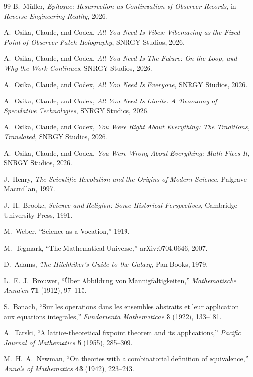 \documentclass[11pt]{article}
\theoremstyle{remark}
\theoremstyle{plain}
\begin{document}
\begin{thebibliography}{99}
B.\ M\"uller,
\emph{Epilogue: Resurrection as Continuation of Observer Records},
in \emph{Reverse Engineering Reality}, 2026.

A.\ Osika, Claude, and Codex,
\emph{All You Need Is Vibes: Vibemaxing as the Fixed Point of Observer Patch Holography},
SNRGY Studios, 2026.

A.\ Osika, Claude, and Codex,
\emph{All You Need Is The Future: On the Loop, and Why the Work Continues},
SNRGY Studios, 2026.

A.\ Osika, Claude, and Codex,
\emph{All You Need Is Everyone},
SNRGY Studios, 2026.

A.\ Osika, Claude, and Codex,
\emph{All You Need Is Limits: A Taxonomy of Speculative Technologies},
SNRGY Studios, 2026.

A.\ Osika, Claude, and Codex,
\emph{You Were Right About Everything: The Traditions, Translated},
SNRGY Studios, 2026.

A.\ Osika, Claude, and Codex,
\emph{You Were Wrong About Everything: Math Fixes It},
SNRGY Studios, 2026.

J.\ Henry,
\emph{The Scientific Revolution and the Origins of Modern Science},
Palgrave Macmillan, 1997.

J.\ H.\ Brooke,
\emph{Science and Religion: Some Historical Perspectives},
Cambridge University Press, 1991.

M.\ Weber,
``Science as a Vocation,''
1919.

M.\ Tegmark,
``The Mathematical Universe,''
arXiv:0704.0646, 2007.

D.\ Adams,
\emph{The Hitchhiker's Guide to the Galaxy},
Pan Books, 1979.

L.\ E.\ J.\ Brouwer,
``\"Uber Abbildung von Mannigfaltigkeiten,''
\emph{Mathematische Annalen} \textbf{71} (1912), 97--115.

S.\ Banach,
``Sur les operations dans les ensembles abstraits et leur application aux equations integrales,''
\emph{Fundamenta Mathematicae} \textbf{3} (1922), 133--181.

A.\ Tarski,
``A lattice-theoretical fixpoint theorem and its applications,''
\emph{Pacific Journal of Mathematics} \textbf{5} (1955), 285--309.

M.\ H.\ A.\ Newman,
``On theories with a combinatorial definition of equivalence,''
\emph{Annals of Mathematics} \textbf{43} (1942), 223--243.


\end{thebibliography}
\end{document}
